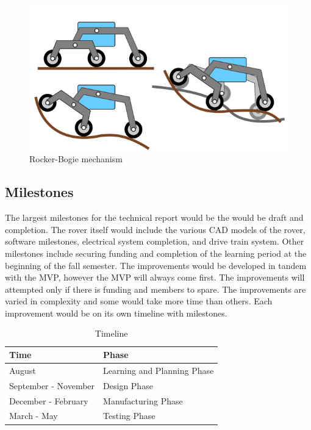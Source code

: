 \documentclass[conference]{IEEEtran} %
\begin{document}
\begin{figure}[hb!]
  \includegraphics[width=\linewidth]{figs/rocker-bogie.png}
  \caption{Rocker-Bogie mechanism}
\label{fig:rockerbogie}
\end{figure}

\subsection{Milestones}
\label{subsec:milestones}
The largest milestones for the technical report would be the would be draft and completion. 
The rover itself would include the various CAD models of the rover, software milestones, electrical system completion, and drive train system. 
Other milestones include securing funding and completion of the learning period at the beginning of the fall semester.
The improvements would be developed in tandem with the MVP, however the MVP will always come first. 
The improvements will attempted only if there is funding and members to spare. 
The improvements are varied in complexity and some would take more time than others. 
Each improvement would be on its own timeline with milestones.

\begin{table}[ht!]
    \caption{Timeline}
    \centering
    {\renewcommand{\arraystretch}{1.5}
    \begin{tabularx}{\linewidth}{LL} 
    \hline
    \textbf{Time} & \textbf{Phase} \\
    \hline
    August & Learning and Planning Phase \\
    September - November & Design Phase  \\
    December - February & Manufacturing Phase \\
    March - May & Testing Phase \\
    \hline
    \end{tabularx}
    }
\label{tab:timeline}
\end{table}
\end{document}
